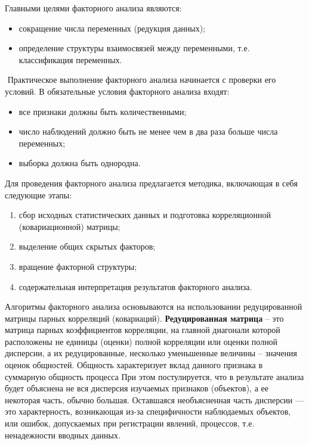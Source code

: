 \documentclass[a4paper, 12pt]{article}
\begin{document}
Главными целями факторного анализа являются:
\begin{itemize}
    \item сокращение числа переменных (редукция данных);
    \item определение структуры взаимосвязей между переменными, т.е. классификация переменных.
\end{itemize}
­	
­Практическое выполнение факторного анализа начинается с проверки его условий. В обязательные условия факторного анализа входят:
\begin{itemize}
    \item все признаки должны быть количественными;
    \item число наблюдений должно быть не менее чем в два раза больше числа переменных;
    \item выборка должна быть однородна.
\end{itemize}

Для проведения факторного анализа предлагается методика, включающая в себя следующие этапы:
\begin{enumerate}
    \item сбор исходных статистических данных и подготовка корреляционной (ковариационной) матрицы;
    \item выделение общих скрытых факторов;
    \item вращение факторной структуры;
    \item содержательная интерпретация результатов факторного анализа.
\end{enumerate}

Алгоритмы факторного анализа основываются на использовании редуцированной матрицы парных корреляций (ковариаций).
\textbf{Редуцированная матрица} – это матрица парных коэффициентов корреляции, на главной диагонали которой расположены не единицы (оценки) полной корреляции или оценки полной дисперсии, а их редуцированные, несколько уменьшенные величины – значения оценок общностей. Общность характеризует вклад данного признака в суммарную общность процесса
При этом постулируется, что в результате анализа будет объяснена не вся дисперсия изучаемых признаков (объектов), а ее некоторая часть, обычно большая. Оставшаяся необъясненная часть дисперсии — это характерность, возникающая из-за специфичности наблюдаемых объектов, или ошибок, допускаемых при регистрации явлений, процессов, т.е. ненадежности вводных данных.
	
\end{document}
